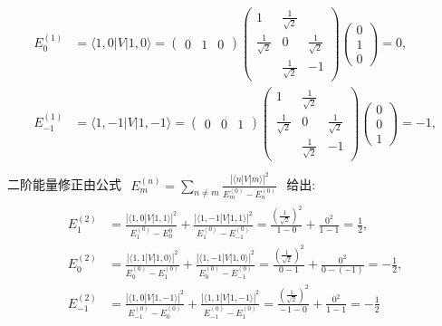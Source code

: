 \documentclass[../../main.tex]{subfiles}
\begin{document}
\begin{enumerate}
\begin{enumerate}
{{\begin{align*}
       E_{0}^{(1)} &= \langle 1,0|V|1,0\rangle = \begin{pmatrix}
        0 & 1 & 0
      \end{pmatrix}\begin{pmatrix}
        1 & \frac{1}{\sqrt{2}}& \\
        \frac{1}{\sqrt{2}} & 0  & \frac{1}{\sqrt{2}}\\
          & \frac{1}{\sqrt{2}} & -1
       \end{pmatrix}\begin{pmatrix}
          0\\
          1\\
          0
       \end{pmatrix} = \boxed{0},\\
       E_{-1}^{(1)} &= \langle 1,-1|V|1,-1\rangle = \begin{pmatrix}
        0 & 0 & 1
      \end{pmatrix}\begin{pmatrix}
        1 & \frac{1}{\sqrt{2}}& \\
        \frac{1}{\sqrt{2}} & 0  & \frac{1}{\sqrt{2}}\\
          & \frac{1}{\sqrt{2}} & -1
       \end{pmatrix}\begin{pmatrix}
          0\\
          0\\
          1
       \end{pmatrix} = \boxed{-1},\\
    \end{align*}
    二阶能量修正由公式 $\begin{aligned}
      E_{m}^{(n)} = \sum_{n\neq m}\frac{|\langle n|V|m\rangle|^{2}}{E_{m}^{(0)} - E_{n}^{(0)}}
    \end{aligned}$ 给出:
    \begin{align*}
      E_{1}^{(2)} &= \frac{|\langle 1,0|V|1,1\rangle|^{2}}{E_{1}^{(0)}-E_{0}^{0}} + \frac{|\langle 1,-1|V|1,1\rangle|^{2}}{E_{1}^{(0)} - E_{-1}^{(0)}} = \frac{\left(\frac{1}{\sqrt{2}}\right)^{2}}{1 - 0} + \frac{0^{2}}{1 - 1} = \boxed{\frac{1}{2}},\\
      E_{0}^{(2)} &= \frac{|\langle 1,1|V|1,0\rangle|^{2}}{E_{0}^{(0)} - E_{1}^{(0)}} + \frac{|\langle 1,-1|V|1,0\rangle|^{2}}{E_{0}^{(0)} - E_{-1}^{(0)}} = \frac{\left(\frac{1}{\sqrt{2}}\right)^{2}}{0-1} + \frac{0^{2}}{0 - (-1)} = \boxed{-\frac{1}{2}},\\
      E_{-1}^{(2)} &= \frac{|\langle 1,0|V|1,-1\rangle|^{2}}{E_{-1}^{(0)} - E_{0}^{(0)}} + \frac{|\langle 1,1|V|1,-1\rangle|^{2}}{E_{-1}^{(0)} - E_{1}^{(0)}} = \frac{\left(\frac{1}{\sqrt{2}}\right)^{2}}{-1-0} + \frac{0^{2}}{1 - 1} = \boxed{-\frac{1}{2}}

\end{align*}}}
\end{enumerate}
\end{enumerate}
\end{document}
